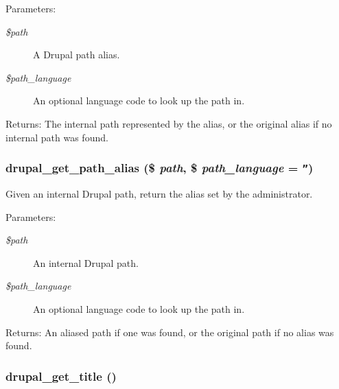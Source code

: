 \begin{Desc}
\item[Parameters:]
\begin{description}
\item[{\em \$path}]A Drupal path alias. \item[{\em \$path\_\-language}]An optional language code to look up the path in.\end{description}
\end{Desc}
\begin{Desc}
\item[Returns:]The internal path represented by the alias, or the original alias if no internal path was found. \end{Desc}
\hypertarget{path_8inc_7612fff6aaa1c06710c753d06ba8c585}{
\subsubsection[{drupal\_\-get\_\-path\_\-alias}]{\setlength{\rightskip}{0pt plus 5cm}drupal\_\-get\_\-path\_\-alias (\$ {\em path}, \/  \$ {\em path\_\-language} = {\tt ''})}}
\label{path_8inc_7612fff6aaa1c06710c753d06ba8c585}


Given an internal Drupal path, return the alias set by the administrator.

\begin{Desc}
\item[Parameters:]
\begin{description}
\item[{\em \$path}]An internal Drupal path. \item[{\em \$path\_\-language}]An optional language code to look up the path in.\end{description}
\end{Desc}
\begin{Desc}
\item[Returns:]An aliased path if one was found, or the original path if no alias was found. \end{Desc}
\hypertarget{path_8inc_88f660bf675e572de22a8469841bbd08}{
\subsubsection[{drupal\_\-get\_\-title}]{\setlength{\rightskip}{0pt plus 5cm}drupal\_\-get\_\-title ()}}
\label{path_8inc_88f660bf675e572de22a8469841bbd08}


